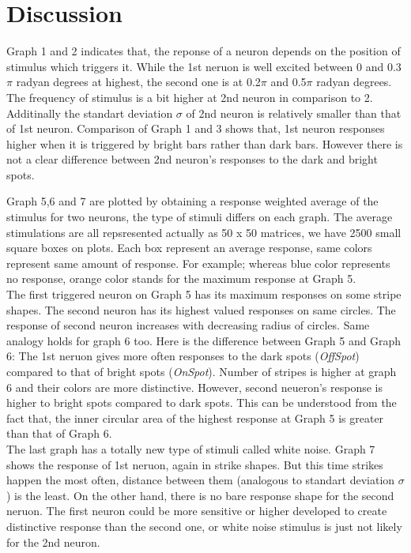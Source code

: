 \documentclass{article}
\begin{document}
\section*{Discussion}

Graph 1 and 2 indicates that, the reponse of a neuron depends on the position of stimulus which triggers it. While the 1st neruon is well excited between 0 and 0.3$\pi$ radyan degrees at highest, the second one is at 0.2$\pi$ and 0.5$\pi$ radyan degrees. The frequency of stimulus is a bit higher at 2nd neuron in comparison to 2. Additinally the standart deviation $\sigma$ of 2nd neuron is relatively smaller than that of 1st neuron. Comparison of Graph 1 and 3 shows that, 1st neuron responses higher when it is triggered by bright bars rather than dark bars. However there is not a clear difference between 2nd neuron's responses to the dark and bright spots.

Graph 5,6 and 7 are plotted by obtaining a response weighted  average of the stimulus for two neurons, the type of stimuli differs on each graph. The average stimulations are all repsresented actually as 50 x 50 matrices, we have 2500 small square boxes on plots. Each box represent an average response, same colors represent same amount of response. For example; whereas blue color represents no response, orange color stands for the maximum response at Graph 5.\\

The first triggered neuron on Graph 5 has its maximum responses on some stripe shapes. The second neuron has its highest valued responses on same circles. The response of second neuron increases with decreasing radius of circles. Same analogy holds for graph 6 too. Here is the difference between Graph 5 and Graph 6: The 1st neruon gives more often responses to the dark spots (\textit{OffSpot}) compared to that of bright spots (\textit{OnSpot}). Number of stripes is higher at graph 6 and their colors are more distinctive. However, second neueron's response is higher to bright spots compared to dark spots. This can be understood from the fact that, the inner circular area of the highest response at Graph 5 is greater than that of Graph 6.\\

The last graph has a totally new type of stimuli called white noise. Graph 7 shows the response of 1st neruon, again in strike shapes. But this time strikes happen the most often, distance between them (analogous to standart deviation $\sigma$) is the least. On the other hand, there is no bare response shape for the second neruon. The first neuron could be more sensitive or higher developed to create distinctive response than the second one, or white noise stimulus is just not likely for the 2nd neuron.\\
\end{document}
